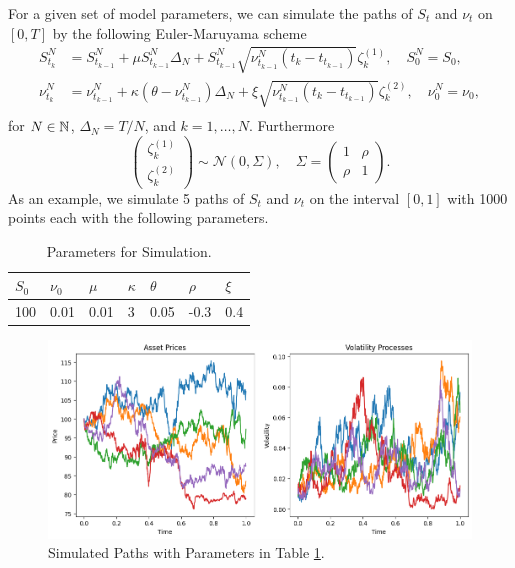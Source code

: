 For a given set of model parameters, we can simulate the paths of $S_{t}$ and $\nu_{t}$ on $[0,T]$ by the following Euler-Maruyama scheme
\begin{align}
    S_{t_{k}}^{N}&= S_{t_{k-1}}^{N} + \mu S_{t_{k-1}}^{N}\Delta_{N} + S_{t_{k-1}}^{N}\sqrt{\nu_{t_{k-1}}^{N}\left(t_{k}-t_{t_{k-1}}\right)}\zeta_{k}^{(1)}, \quad S_{0}^{N}=S_{0},\\
    \nu_{t_{k}}^{N}&= \nu_{t_{k-1}}^{N} + \kappa(\theta-\nu_{t_{k-1}}^{N})\Delta_{N} + \xi\sqrt{\nu_{t_{k-1}}^{N}\left(t_{k}-t_{t_{k-1}}\right)}\zeta_{k}^{(2)}, \quad \nu_{0}^{N}=\nu_{0},\\
\end{align}
for $N\in\mathbb{N}$, $\Delta_{N}=T/N$, and $k=1,\dots,N$. Furthermore
\begin{equation}
    \begin{pmatrix}
        \zeta_{k}^{(1)}\\
        \zeta_{k}^{(2)}
    \end{pmatrix} \sim \mathcal{N}(0,\Sigma),\quad \Sigma = \begin{pmatrix}
        1 & \rho \\
        \rho & 1
    \end{pmatrix}.
\end{equation}
As an example, we simulate 5 paths of $S_{t}$ and $\nu_{t}$ on the interval $[0,1]$ with 1000 points each with the following parameters.
\begin{table}[H]
\centering
\begin{tabular}{@{}lllllll@{}}
\toprule
$S_{0}$  & $\nu_{0}$   & $\mu$   & $\kappa$ & $\theta$ & $\rho$  & $\xi$ \\ \midrule
100 & 0.01 & 0.01 & 3     & 0.05  & -0.3 & 0.4   \\ \bottomrule
\end{tabular}
\caption{Parameters for Simulation.}
\label{heston_tab}
\end{table}

\begin{figure}[H]
    \centering
    \includegraphics[scale=0.55]{fig/img/HestonModel/heston_simulations.png}
    \caption{Simulated Paths with Parameters in Table \ref{heston_tab}.}
    \label{fig:heston_simsl}
\end{figure}

